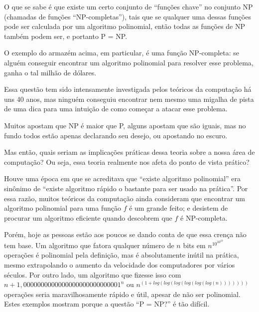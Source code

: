 O que se sabe é que existe um certo conjunto de ``funções chave'' no
conjunto NP (chamadas de funções ``NP-completas''), tais que se
qualquer uma dessas funções pode ser calculada por um algoritmo polinomial, então
todas as funções de NP também podem ser, e portanto P = NP.

O exemplo do armazém acima, em particular, é uma função NP-completa: se alguém
conseguir encontrar um algoritmo polinomial para resolver esse
problema, ganha o tal milhão de dólares.

Essa questão tem sido intensamente investigada pelos teóricos da
computação há uns 40 anos, mas ninguém conseguiu encontrar nem mesmo
uma migalha de pista de uma dica para uma intuição de como começar a
atacar esse problema.

Muitos apostam que NP é maior que P, alguns
apostam que são iguais, mas no fundo todos estão apenas declarando
seu desejo, ou apostando no escuro.



Mas então, quais seriam as implicações práticas dessa teoria sobre
a nossa área de computação?
Ou seja, essa teoria realmente nos afeta do ponto de vista prático?

Houve uma época em que se acreditava que ``existe algoritmo
polinomial'' era sinônimo de ``existe algoritmo rápido o bastante
para ser usado na prática''.
Por essa razão, muitos teóricos da computação ainda
consideram que encontrar um algoritmo polinomial para uma 
função $f$ é um grande feito; e desistem de procurar um algoritmo
eficiente quando descobrem que $f$ é NP-completa.

Porém, hoje as pessoas estão aos poucos se dando conta de que essa
crença não tem base. Um algoritmo que fatora qualquer número de
$n$ bits em $n^{10^{10^{10}}}$ operações é polinomial pela definição, mas é
absolutamente inútil na prática, mesmo extrapolando o aumento da
velocidade dos computadores por vários séculos.
Por outro lado, um algoritmo que fizesse isso com $n + 1,0000000000000000000000000001^{n}$ ou
$n^{(1+log(log(log(log(log(log(n)))))))}$ operações seria maravilhosamente
rápido e útil, apesar de não ser polinomial.
Estes exemplos mostram porque a questão ``P = NP?'' é tão
difícil.

